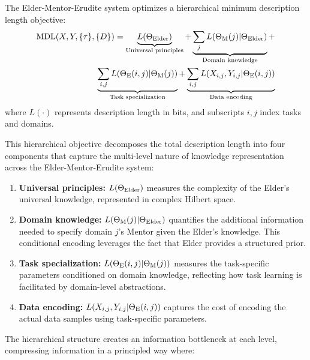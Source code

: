\begin{theorem}
\label{thm:hierarchical_mdl}
The Elder-Mentor-Erudite system optimizes a hierarchical minimum description length objective:
\begin{equation}
\begin{split}
\text{MDL}(X, Y, \{\tau\}, \{D\}) = \underbrace{L(\Theta_{\text{Elder}})}_{\text{Universal principles}} + \underbrace{\sum_j L(\Theta_{\text{M}}(j) | \Theta_{\text{Elder}})}_{\text{Domain knowledge}} + \\
\underbrace{\sum_{i,j} L(\Theta_{\text{E}}(i,j) | \Theta_{\text{M}}(j))}_{\text{Task specialization}} + \underbrace{\sum_{i,j} L(X_{i,j}, Y_{i,j} | \Theta_{\text{E}}(i,j))}_{\text{Data encoding}}
\end{split}
\end{equation}
where $L(\cdot)$ represents description length in bits, and subscripts $i,j$ index tasks and domains.

This hierarchical objective decomposes the total description length into four components that capture the multi-level nature of knowledge representation across the Elder-Mentor-Erudite system:

\begin{enumerate}
    \item \textbf{Universal principles:} $L(\Theta_{\text{Elder}})$ measures the complexity of the Elder's universal knowledge, represented in complex Hilbert space.
    
    \item \textbf{Domain knowledge:} $L(\Theta_{\text{M}}(j) | \Theta_{\text{Elder}})$ quantifies the additional information needed to specify domain $j$'s Mentor given the Elder's knowledge. This conditional encoding leverages the fact that Elder provides a structured prior.
    
    \item \textbf{Task specialization:} $L(\Theta_{\text{E}}(i,j) | \Theta_{\text{M}}(j))$ measures the task-specific parameters conditioned on domain knowledge, reflecting how task learning is facilitated by domain-level abstractions.
    
    \item \textbf{Data encoding:} $L(X_{i,j}, Y_{i,j} | \Theta_{\text{E}}(i,j))$ captures the cost of encoding the actual data samples using task-specific parameters.
\end{enumerate}

The hierarchical structure creates an information bottleneck at each level, compressing information in a principled way where:


\end{theorem}
